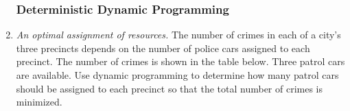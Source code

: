 \begin{enumerate}
\begin{comment}
The distances between cities are:

\begin{center}
\begin{tabular}{lrrrr}
  & \multicolumn{4}{c}{Distance in miles} \\
            & Bemidji & Park Rapids & Crookston & Detroit Lakes \\
Bemidji     &  0  &     47   &      87   &     85\\
Park Rapids  & 47  &     0    &      114  &     39\\
Crookston   & 87  &     114  &      0    &     92\\
Detroit Lakes& 85  &     39   &      92   &     0
\end{tabular}
\end{center}

Find an assignment of teams to divisions that minimizes total league
travel.

\begin{solution}
\bs The league structure that minimizes total travel is to assign
Bemidji and Crookston to one division, and assign Detroit Lakes and
Park Rapids to the other division. My AMPL output is shown below.

\begin{Verbatim}[samepage=true]
ampl: include '/home/darin/Dropbox/isye/ie1101/ampl/options.run';
ampl: model '/home/darin/Dropbox/isye/ie1101/hw/realignment.mod';
ampl: data '/home/darin/Dropbox/isye/ie1101/hw/realignment-mn.dat';
ampl: solve;
CPLEX 12.7.1.0: sensitivity
CPLEX 12.7.1.0: optimal integer solution; objective 2360
36 MIP simplex iterations
0 branch-and-bound nodes

suffix up OUT;
suffix down OUT;
suffix current OUT;
ampl: display x;
x :=
bemidji      divA   1
bemidji      divB   0
crookston    divA   1
crookston    divB   0
detroitlakes divA   0
detroitlakes divB   1
parkrapids   divA   0
parkrapids   divB   1
;  
\end{Verbatim}
\end{solution}
\end{comment}

\subsubsection*{Deterministic Dynamic Programming}

\item \emph{An optimal assignment of resources.} 
The number of crimes in each of a city's three
  precincts depends on the number of police cars assigned to each
  precinct. The number of crimes is shown in the table below. Three
  patrol cars are available. Use dynamic programming to determine how
  many patrol cars should be assigned to each precinct so that the
  total number of crimes is minimized.


\end{enumerate}
